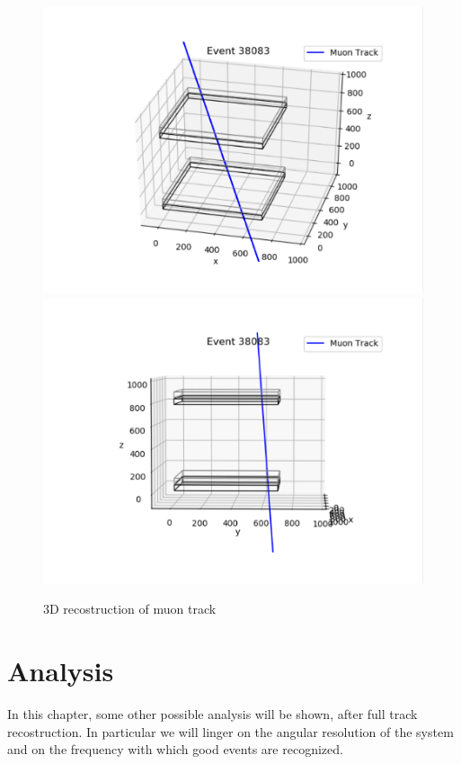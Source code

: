 \documentclass[a4paper,11pt]{book}
\begin{document}
\begin{figure}[hbtp]
\centering
\includegraphics[scale=0.5]{pictures/Track_3D.pdf}
\includegraphics[scale=0.5]{pictures/Track_3D_2.pdf}
\caption{3D recostruction of muon track}
\label{fig:3D_track}
\end{figure}




\chapter{Analysis}

In this chapter, some other possible analysis will be shown, after full track recostruction. In particular we will linger on the angular resolution of the system and on the frequency with which good events are recognized.\\
\end{document}

